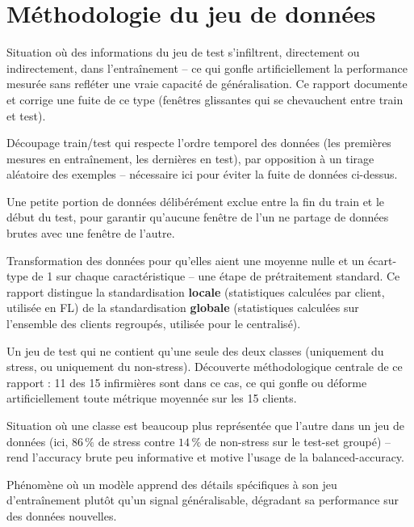 \documentclass[11pt]{article}
\begin{document}
\section{Méthodologie du jeu de données}

\begin{description}[leftmargin=0em, style=nextline]

\item[Fuite de données (\textit{data leakage})] Situation où des informations du
jeu de test s'infiltrent, directement ou indirectement, dans l'entraînement -- ce qui
gonfle artificiellement la performance mesurée sans refléter une vraie capacité de
généralisation. Ce rapport documente et corrige une fuite de ce type (fenêtres glissantes
qui se chevauchent entre train et test).

\item[Split chronologique] Découpage train/test qui respecte l'ordre temporel des
données (les premières mesures en entraînement, les dernières en test), par opposition à
un tirage aléatoire des exemples -- nécessaire ici pour éviter la fuite de données
ci-dessus.

\item[\textit{Gap} anti-fuite] Une petite portion de données délibérément exclue entre
la fin du train et le début du test, pour garantir qu'aucune fenêtre de l'un ne partage
de données brutes avec une fenêtre de l'autre.

\item[Standardisation] Transformation des données pour qu'elles aient une moyenne nulle
et un écart-type de 1 sur chaque caractéristique -- une étape de prétraitement standard.
Ce rapport distingue la standardisation \textbf{locale} (statistiques calculées par
client, utilisée en FL) de la standardisation \textbf{globale} (statistiques calculées
sur l'ensemble des clients regroupés, utilisée pour le centralisé).

\item[Test-set mono-classe] Un jeu de test qui ne contient qu'une seule des deux classes
(uniquement du stress, ou uniquement du non-stress). Découverte méthodologique centrale
de ce rapport : 11 des 15 infirmières sont dans ce cas, ce qui gonfle ou déforme
artificiellement toute métrique moyennée sur les 15 clients.

\item[Déséquilibre de classe (\textit{class imbalance})] Situation où une classe est
beaucoup plus représentée que l'autre dans un jeu de données (ici, $86\,\%$ de stress
contre $14\,\%$ de non-stress sur le test-set groupé) -- rend l'accuracy brute peu
informative et motive l'usage de la balanced-accuracy.

\item[Surapprentissage (\textit{overfitting})] Phénomène où un modèle apprend des
détails spécifiques à son jeu d'entraînement plutôt qu'un signal généralisable,
dégradant sa performance sur des données nouvelles.

\end{description}
\end{document}
